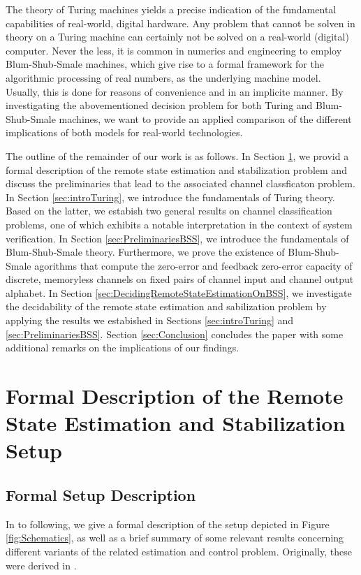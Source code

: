 \documentclass[conference]{IEEEtran}
\begin{document}
	The theory of Turing machines yields a precise indication of the fundamental capabilities of real-world, digital hardware. Any problem that cannot be solven in theory on a Turing machine
	can certainly not be solved on a real-world (digital) computer. Never the less, it is common in numerics and engineering to employ Blum-Shub-Smale machines,
	which give rise to a formal framework for the algorithmic processing of real numbers, as the underlying machine model. Usually, this is done for reasons of convenience and in an implicite manner. 
	By investigating the abovementioned decision problem for both Turing and Blum-Shub-Smale machines, we want to provide an applied comparison of the different implications of 
	both models for real-world technologies. 
	
	The outline of the remainder of our work is as follows. In Section \ref{sec:FormalEstimationSetup}, we provid a formal description of the remote state estimation and stabilization problem
	and discuss the preliminaries that lead to the associated channel classficaton problem. In Section \ref{sec:introTuring}, we introduce the fundamentals of Turing theory.
	Based on the latter, we estabish two general results on channel classification problems, one of which exhibits a notable interpretation in the context of system verification. 
	In Section \ref{sec:PreliminariesBSS}, we introduce the fundamentals of Blum-Shub-Smale theory. Furthermore, we prove the existence of 
	Blum-Shub-Smale agorithms that compute the zero-error and feedback zero-error capacity of discrete, memoryless channels on fixed pairs of channel input and channel output alphabet. 
	In Section \ref{sec:DecidingRemoteStateEstimationOnBSS}, we investigate the decidability of the remote state estimation and sabilization problem 
	by applying the results we estabished in Sections \ref{sec:introTuring} and \ref{sec:PreliminariesBSS}. Section \ref{sec:Conclusion} concludes the paper with some additional 
	remarks on the implications of our findings. 
                                                                        
\section{Formal Description of the Remote State Estimation and Stabilization Setup}	\label{sec:FormalEstimationSetup}
	
	\subsection{Formal Setup Description}
	\noindent In to following, we give a formal description of the setup depicted in Figure \ref{fig:Schematics}, as well as a brief summary of 
	some relevant results concerning different variants of the related estimation and control problem. Originally, these were derived in \cite{MS07, MS07SC}.  
	
\end{document}
